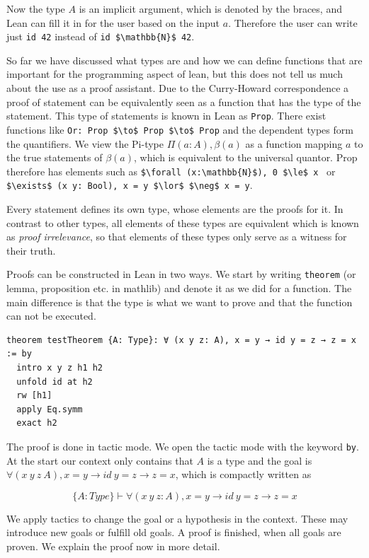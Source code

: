 Now the type $A$ is an implicit argument, which is denoted by the braces, and Lean can fill it in for the user based on the input $a$. Therefore the user can write just \lstinline|id 42| instead of \lstinline|id $\mathbb{N}$ 42|.

So far we have discussed what types are and how we can define functions that are important for the programming aspect of lean, but this does not tell us much about the use as a proof assistant. Due to the Curry-Howard correspondence a proof of statement can be equivalently seen as a function that has the type of the statement. This type of statements is known in Lean as \lstinline|Prop|. There exist functions like \lstinline|Or: Prop $\to$ Prop $\to$ Prop| and the dependent types form the quantifiers. We view the Pi-type $\Pi (a:A), \beta(a)$ as a function mapping $a$ to the true statements of $\beta(a)$, which is equivalent to the universal quantor. Prop therefore has elements such as \lstinline|$\forall (x:\mathbb{N}$), 0 $\le$ x | or \lstinline|$\exists$ (x y: Bool), x = y $\lor$ $\neg$ x = y|.

Every statement defines its own type, whose elements are the proofs for it. In contrast to other types, all elements of these types are equivalent which is known as \textit{proof irrelevance}, so that elements of these types only serve as a witness for their truth.

Proofs can be constructed in Lean in two ways.  We start by writing \lstinline|theorem| (or lemma, proposition etc. in mathlib) and denote it as we did for a function. The main difference is that the type is what we want to prove and that the function can not be executed.

\begin{lstlisting}
theorem testTheorem {A: Type}: ∀ (x y z: A), x = y → id y = z → z = x := by
  intro x y z h1 h2
  unfold id at h2
  rw [h1]
  apply Eq.symm
  exact h2
\end{lstlisting}

The proof is done in tactic mode. We open the tactic mode with the keyword \lstinline|by|. At the start our context only contains that $A$ is a type and the goal is $∀ (x\ y\ z\: A), x = y → id\ y = z → z = x$, which is compactly written as

\[ \{A:Type\} \vdash ∀ (x\ y\ z: A), x = y → id\ y = z → z = x\]

We apply tactics to change the goal or a hypothesis in the context. These may introduce new goals or fulfill old goals. A proof is finished, when all goals are proven. We explain the proof now in more detail.

